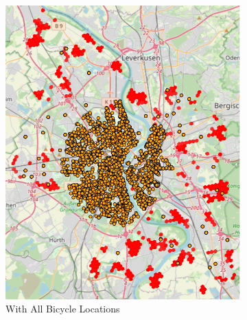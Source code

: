 \begin{figure}
\begin{subfigure}[b]{0.30\textwidth}
         \includegraphics[width=\textwidth]{Figures/results/problematic_hexagons/unfixable_with_bicycles.png}
         \caption{With All Bicycle Locations}
         \label{fig:unfixable_with_bicycles}
     \end{subfigure}
     \hfill
     \begin{subfigure}[b]{0.30\textwidth}
         \centering

\end{subfigure}
\end{figure}
